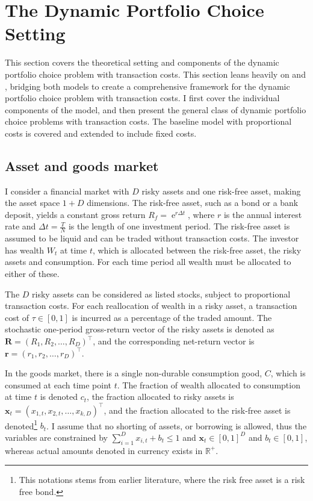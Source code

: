 \documentclass[11pt]{article}
\begin{document}
\fi

\section{The Dynamic Portfolio Choice Setting} \label{Section: Economic-theory}
This section covers the theoretical setting and components of the dynamic portfolio choice problem with transaction costs.
This section leans heavily on \autocite{CaiJuddXu2020} and \autocite{Scheidegger2023},
bridging both models to create a comprehensive framework for the dynamic portfolio choice problem with transaction costs.
I first cover the individual components of the model, and then present the general class of dynamic portfolio choice problems with transaction costs.
The baseline model with proportional costs is covered and extended to include fixed costs.
\subsection{Asset and goods market} \label{Subsection: Market}
I consider a financial market with \(D\) risky assets and one risk-free asset, making the asset space \(1 + D\) dimensions. 
The risk-free asset, such as a bond or a bank deposit, yields a constant gross return \(R_f = \operatorname{e}^{r\Delta t}\), 
where \(r\) is the annual interest rate and \(\Delta t = \frac{T}{N}\) is the length of one investment period. 
The risk-free asset is assumed to be liquid and can be traded without transaction costs. The investor has wealth \(W_t\) at time \(t\), which is allocated between the risk-free asset, the risky assets and consumption.
For each time period all wealth must be allocated to either of these.

The \(D\) risky assets can be considered as listed stocks, subject to proportional transaction costs. 
For each reallocation of wealth in a risky asset, a transaction cost of \(\tau \in [0,1]\)
is incurred as a percentage of the traded amount. 
The stochastic one-period gross-return vector of the risky assets is denoted as
\(\mathbf{R} = (R_1, R_2, \ldots, R_D)^\top\), and the corresponding net-return vector is
\(\mathbf{r} = (r_1, r_2, \ldots, r_D)^\top\).

In the goods market, there is a single non-durable consumption good, \(C\), which is consumed at each time point \(t\). 
The fraction of wealth allocated to consumption at time \(t\) is denoted \(c_t\),
the fraction allocated to risky assets is \(\mathbf{x}_t = (x_{1,t}, x_{2,t}, \dots, x_{k,D})^\top\),
and the fraction allocated to the risk-free asset is denoted\footnote{This notations stems from earlier literature, where the risk free asset is a risk free bond.} \(b_t\). 
I assume that no shorting of assets, or borrowing is allowed,
thus the variables are constrained by \(\sum_{i=1}^D x_{i,t} + b_t \leq 1\) and
\(\mathbf{x}_t \in [0,1]^D\) and \(b_t \in [0,1]\), whereas actual amounts denoted in currency exists in $\mathbb{R}^{+}$.
\end{document}
